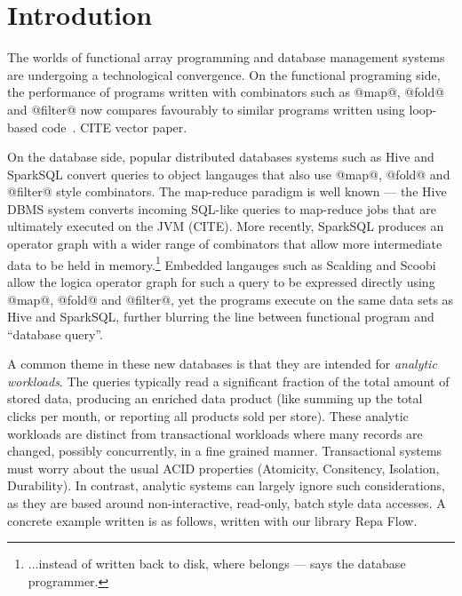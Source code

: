 \section{Introdution}

The worlds of functional array programming and database management systems are undergoing a technological convergence. On the functional programing side, the performance of programs written with combinators such as @map@, @fold@ and @filter@ now compares favourably to similar programs written using loop-based code~\cite{Keller:Repa,Lippmeier:stencil,Lippmeier:guiding}. CITE vector paper. 

On the database side, popular distributed databases systems such as Hive and SparkSQL convert queries to object langauges that also use @map@, @fold@ and @filter@ style combinators. The map-reduce paradigm is well known --- the Hive DBMS system converts incoming SQL-like queries to map-reduce jobs that are ultimately executed on the JVM (CITE). More recently, SparkSQL produces an operator graph with a wider range of combinators that allow more intermediate data to be held in memory.\footnote{...instead of written back to disk, where belongs --- says the database programmer.} Embedded langauges such as Scalding and Scoobi allow the logica operator graph for such a query to be expressed directly using @map@, @fold@ and @filter@, yet the programs execute on the same data sets as Hive and SparkSQL, further blurring the line between functional program and ``database query''.

A common theme in these new databases is that they are intended for \emph{analytic workloads}. The queries typically read a significant fraction of the total amount of stored data, producing an enriched data product (like summing up the total clicks per month, or reporting all products sold per store). These analytic workloads are distinct from transactional workloads where many records are changed, possibly concurrently, in a fine grained manner. Transactional systems must worry about the usual ACID properties (Atomicity, Consitency, Isolation, Durability). In contrast, analytic systems can largely ignore such considerations, as they are based around non-interactive, read-only, batch style data accesses. A concrete example written is as follows, written with our library Repa Flow.

\begin{code}

\end{code}

